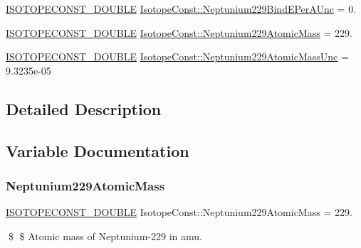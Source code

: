 \begin{DoxyCompactItemize}
\mbox{\hyperlink{group___isotope_const-_macros_ga8f45a7272ce02c0b4c65c44636ed719a}{I\+S\+O\+T\+O\+P\+E\+C\+O\+N\+S\+T\+\_\+\+D\+O\+U\+B\+LE}} \mbox{\hyperlink{group___isotope_const-_neptunium-_np229_ga71c06af75ff229408cb477e2e37b9204}{Isotope\+Const\+::\+Neptunium229\+Bind\+E\+Per\+A\+Unc}} = 0.
\item 
\mbox{\hyperlink{group___isotope_const-_macros_ga8f45a7272ce02c0b4c65c44636ed719a}{I\+S\+O\+T\+O\+P\+E\+C\+O\+N\+S\+T\+\_\+\+D\+O\+U\+B\+LE}} \mbox{\hyperlink{group___isotope_const-_neptunium-_np229_ga90e42f5a716a59f4f1568f687449248a}{Isotope\+Const\+::\+Neptunium229\+Atomic\+Mass}} = 229.
\item 
\mbox{\hyperlink{group___isotope_const-_macros_ga8f45a7272ce02c0b4c65c44636ed719a}{I\+S\+O\+T\+O\+P\+E\+C\+O\+N\+S\+T\+\_\+\+D\+O\+U\+B\+LE}} \mbox{\hyperlink{group___isotope_const-_neptunium-_np229_ga97ffc85bbd61aea1ed0defad1dd1a892}{Isotope\+Const\+::\+Neptunium229\+Atomic\+Mass\+Unc}} = 9.\+3235e-\/05
\end{DoxyCompactItemize}


\subsection{Detailed Description}


\subsection{Variable Documentation}
\mbox{\label{group___isotope_const-_neptunium-_np229_ga90e42f5a716a59f4f1568f687449248a}} 
\subsubsection{\texorpdfstring{Neptunium229\+Atomic\+Mass}{Neptunium229AtomicMass}}
{\footnotesize\ttfamily \mbox{\hyperlink{group___isotope_const-_macros_ga8f45a7272ce02c0b4c65c44636ed719a}{I\+S\+O\+T\+O\+P\+E\+C\+O\+N\+S\+T\+\_\+\+D\+O\+U\+B\+LE}} Isotope\+Const\+::\+Neptunium229\+Atomic\+Mass = 229.}

\$ \$ Atomic mass of Neptunium-\/229 in amu. \mbox{\label{group___isotope_const-_neptunium-_np229_ga97ffc85bbd61aea1ed0defad1dd1a892}} 
